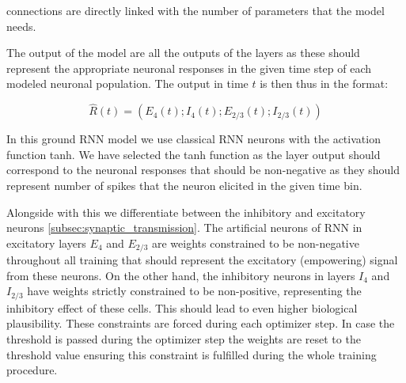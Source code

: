 connections are directly linked with the number of parameters that the model needs.

The output of the model are all the outputs of the layers as these should represent the appropriate neuronal responses in the given time step of each modeled neuronal population. The output in time $t$ is then thus in the format:

$$\hat{R}(t) = (E_4(t); I_4(t); E_{2/3}(t); I_{2/3}(t)) $$

In this ground RNN model we use classical RNN neurons with the activation function tanh. We have selected the tanh function as the layer output should correspond to the neuronal responses that should be non-negative as they should represent number of spikes that the neuron elicited in the given time bin.

Alongside with this we differentiate between the inhibitory and excitatory neurons \ref{subsec:synaptic_transmission}. The artificial neurons of RNN in excitatory layers $E_4$ and $E_{2/3}$ are weights constrained to be non-negative throughout all training that should represent the excitatory (empowering) signal from these neurons. On the other hand, the inhibitory neurons in layers $I_4$ and $I_{2/3}$ have weights strictly constrained to be non-positive, representing the inhibitory effect of these cells. This should lead to even higher biological plausibility. These constraints are forced during each optimizer step. In case the threshold is passed during the optimizer step the weights are reset to the threshold value ensuring this constraint is fulfilled during the whole training procedure.

